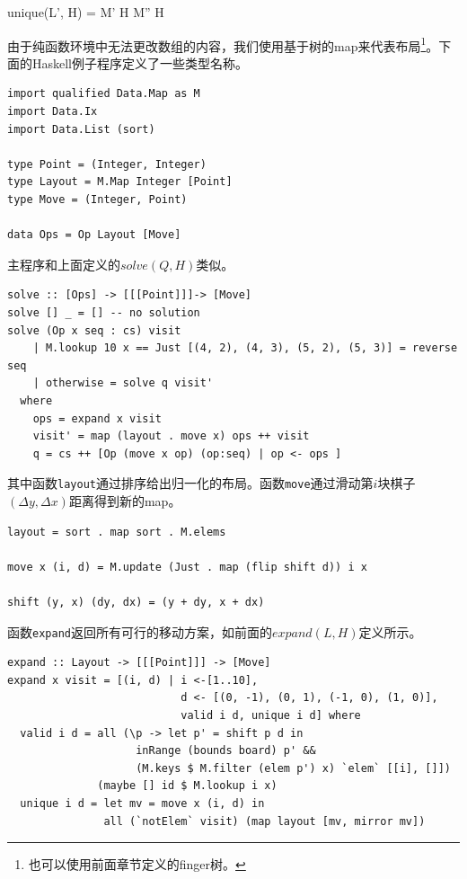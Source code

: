 \documentclass[UTF8]{article}
\begin{document}
\be
unique(L', H) = M' \notin H \land M'' \notin H
\ee

由于纯函数环境中无法更改数组的内容，我们使用基于树的map来代表布局\footnote{也可以使用前面章节定义的finger树。}。下面的Haskell例子程序定义了一些类型名称。

\lstset{language=Haskell}
\begin{lstlisting}
import qualified Data.Map as M
import Data.Ix
import Data.List (sort)

type Point = (Integer, Integer)
type Layout = M.Map Integer [Point]
type Move = (Integer, Point)

data Ops = Op Layout [Move]
\end{lstlisting}

主程序和上面定义的$solve(Q, H)$类似。

\lstset{language=Haskell}
\begin{lstlisting}
solve :: [Ops] -> [[[Point]]]-> [Move]
solve [] _ = [] -- no solution
solve (Op x seq : cs) visit
    | M.lookup 10 x == Just [(4, 2), (4, 3), (5, 2), (5, 3)] = reverse seq
    | otherwise = solve q visit'
  where
    ops = expand x visit
    visit' = map (layout . move x) ops ++ visit
    q = cs ++ [Op (move x op) (op:seq) | op <- ops ]
\end{lstlisting}

其中函数\texttt{layout}通过排序给出归一化的布局。函数\texttt{move}通过滑动第$i$块棋子$(\Delta y, \Delta x)$距离得到新的map。

\lstset{language=Haskell}
\begin{lstlisting}
layout = sort . map sort . M.elems

move x (i, d) = M.update (Just . map (flip shift d)) i x

shift (y, x) (dy, dx) = (y + dy, x + dx)
\end{lstlisting}

函数\texttt{expand}返回所有可行的移动方案，如前面的$expand(L, H)$定义所示。

\lstset{language=Haskell}
\begin{lstlisting}
expand :: Layout -> [[[Point]]] -> [Move]
expand x visit = [(i, d) | i <-[1..10],
                           d <- [(0, -1), (0, 1), (-1, 0), (1, 0)],
                           valid i d, unique i d] where
  valid i d = all (\p -> let p' = shift p d in
                    inRange (bounds board) p' &&
                    (M.keys $ M.filter (elem p') x) `elem` [[i], []])
              (maybe [] id $ M.lookup i x)
  unique i d = let mv = move x (i, d) in
               all (`notElem` visit) (map layout [mv, mirror mv])
\end{lstlisting}
\end{document}
